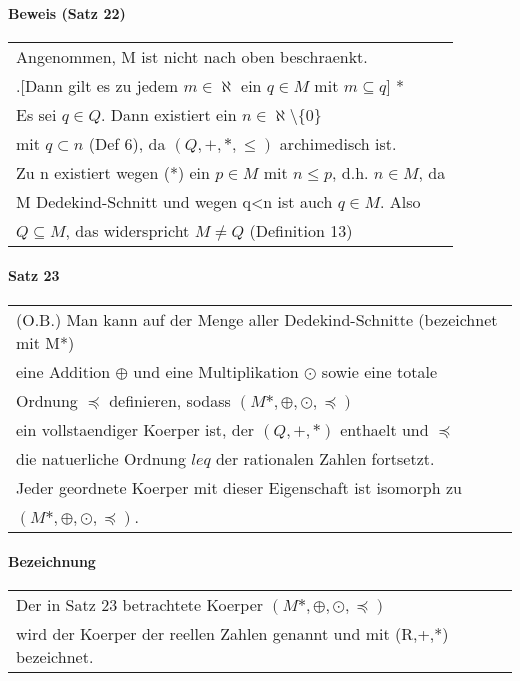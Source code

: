 \documentclass{scrartcl}
\begin{document}
\paragraph{Beweis (Satz 22)}
\begin{tabbing}
\begin{tabular}{l}
Angenommen, M ist nicht nach oben beschraenkt.\\
.[Dann gilt es zu jedem $m\in \aleph$ ein $q\in M$ mit $m \subseteq q$] *\\
Es sei $q\in Q$. Dann existiert ein $n\in \aleph\setminus\{ 0\}$\\
mit $q\subset n $ (Def 6), da $(Q,+,*,\leq)$ archimedisch ist.\\
Zu n existiert wegen (*) ein $p\in M$ mit $n \leq p$, d.h. $n \in M$, da\\
M Dedekind-Schnitt und wegen q<n ist auch $q\in M$. Also \\
$Q \subseteq M$, das widerspricht $M \neq Q$ (Definition 13)
\end{tabular}
\end{tabbing}

\paragraph{Satz 23}
\begin{tabbing}
\begin{tabular}{l}
(O.B.) Man kann auf der Menge aller Dedekind-Schnitte (bezeichnet mit M*)\\
eine Addition $\oplus$ und eine Multiplikation $\odot$ sowie eine totale\\
Ordnung $\preceq$ definieren, sodass $(M*,\oplus,\odot,\preceq)$\\
ein vollstaendiger Koerper ist, der $(Q,+,*)$ enthaelt und $\preceq$\\
die natuerliche Ordnung $leq$ der rationalen Zahlen fortsetzt.\\
Jeder geordnete Koerper mit dieser Eigenschaft ist isomorph zu\\
$(M*,\oplus,\odot,\preceq)$.
\end{tabular}
\end{tabbing}

\paragraph{Bezeichnung}
\begin{tabbing}
\begin{tabular}{l}
Der in Satz 23 betrachtete Koerper $(M*,\oplus,\odot,\preceq)$\\
wird der Koerper der reellen Zahlen genannt und mit (R,+,*) bezeichnet.
\end{tabular}
\end{tabbing}
\end{document}
